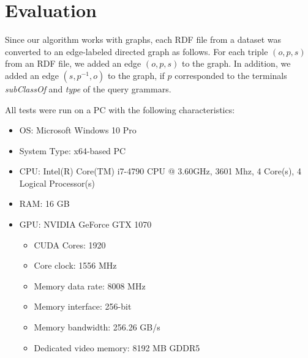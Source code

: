\section{Evaluation}
\label{section_evaluation}


Since our algorithm works with graphs, each RDF file from a dataset was converted to an edge-labeled directed graph as follows. For each triple $(o,p,s)$ from an RDF file, we added an edge $(o,p,s)$ to the graph. In addition, we added an edge $(s,p^{-1},o)$ to the graph, if $p$ corresponded to the terminals \emph{subClassOf} and \emph{type} of the query grammars. %

All tests were run on a PC with the following characteristics:

\begin{itemize}
	\item OS: Microsoft Windows 10 Pro
	\item System Type: x64-based PC
	\item CPU: Intel(R) Core(TM) i7-4790 CPU @ 3.60GHz, 3601 Mhz, 4 Core(s), 4 Logical Processor(s)
	\item RAM: 16 GB
	\item GPU: NVIDIA GeForce GTX 1070
	\begin{itemize}
		\item CUDA Cores:		1920 
		\item Core clock:		1556 MHz 
		\item Memory data rate:	8008 MHz
		\item Memory interface:	256-bit 
		\item Memory bandwidth:	256.26 GB/s
		\item Dedicated video memory:	8192 MB GDDR5
	\end{itemize}
\end{itemize}

